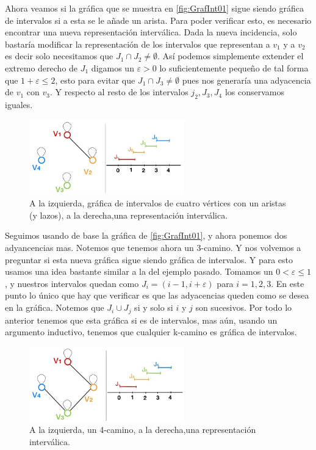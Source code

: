     \label{exmpl:202}
    Ahora veamos si la gráfica que se muestra en \cref{fig:GrafInt01} sigue siendo gráfica de intervalos si a esta se le añade un arista. Para poder verificar esto, es necesario encontrar una nueva representación interválica.
    Dada la nueva incidencia, solo bastaría modificar la representación de los intervalos que representan a $v_1 $ y a $v_2$ es decir solo necesitamos que $J_1 \cap J_2 \neq \emptyset$.
    Así podemos simplemente extender el extremo derecho de $J_1$ digamos un $\varepsilon >0 $ lo suficientemente pequeño de tal forma que $1+\varepsilon \leq 2$, esto para evitar que $J_1 \cap J_3 \neq \emptyset$ pues nos generaría una adyacencia de $v_1 $ con $v_3$. Y respecto al resto de los intervalos $j_2, J_3, J_4$ los conservamos iguales.    


\begin{figure}[H]
  \centering
  \includegraphics[width=0.6\textwidth]{recursos/capturas/202}
  \caption{A la izquierda, gráfica de intervalos de cuatro vértices con un aristas (y lazos), a la derecha,una representación interválica.}
  \label{fig:GrafInt02}
\end{figure}


Seguimos usando de base la gráfica de  \cref{fig:GrafInt01}, y ahora ponemos dos adyancencias mas. Notemos que tenemos ahora un 3-camino. 
Y nos volvemos a preguntar si esta nueva gráfica sigue siendo gráfica de intervalos. Y para esto usamos una idea bastante similar a la del ejemplo pasado. Tomamos un $0 < \varepsilon \leq 1$, y nuestros intervalos quedan como $J_i=(i-1, i+\varepsilon)$ para $i=1,2,3$.
En este punto lo único que hay que verificar es que las adyacencias queden como se desea en la gráfica. Notemos que $J_i \cup J_j $ si y solo si $i$ y $j$ son sucesivos. Por todo lo anterior tenemos que esta gráfica si es de intervalos, mas aún, usando un argumento inductivo, tenemos que cualquier k-camino es gráfica de intervalos.


\begin{figure}[H]
  \centering
  \includegraphics[width=0.6\textwidth]{recursos/capturas/203.jpg}
  \caption{A la izquierda, un 4-camino, a la derecha,una representación interválica.}
  \label{fig:GrafInt03}
\end{figure}

